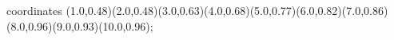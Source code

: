 					coordinates { (1.0,0.48)(2.0,0.48)(3.0,0.63)(4.0,0.68)(5.0,0.77)(6.0,0.82)(7.0,0.86)(8.0,0.96)(9.0,0.93)(10.0,0.96)};